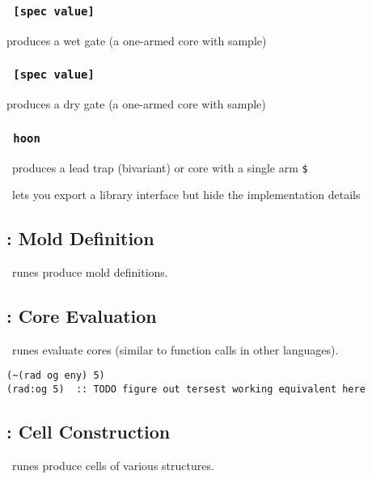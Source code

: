 \subsubsection{\textbf{\bartar\texttt{~[spec value]}}}
\label{ap:barcen}
produces a wet gate (a one-armed core with sample)

\subsubsection{\textbf{\bartis\texttt{~[spec value]}}}
\label{ap:barcen}
produces a dry gate (a one-armed core with sample)

\subsubsection{\textbf{\barwut\texttt{~hoon}}}
\label{ap:barwut}

\pbarwut~produces a lead trap (bivariant) or core with a single arm \texttt{\$}

\lead~lets you export a library interface but hide the implementation details

\subsection{\pbuc:  Mold Definition}

\pbuc~runes produce mold definitions.

\subsection{\pcen:  Core Evaluation}

\pcen~runes evaluate cores (similar to function calls in other languages).

\begin{lstlisting}
(~(rad og eny) 5)
(rad:og 5)  :: TODO figure out tersest working equivalent here
\end{lstlisting}

\subsection{\pcol:  Cell Construction}

\pcol~runes produce cells of various structures.

